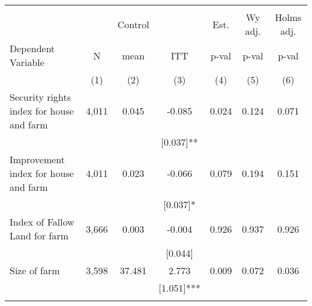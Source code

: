 \begin{tabular}{lcccccc}
\hline \noalign{\smallskip} &  &  &  &  &  & \\
 &  & Control &  & Est. & Wy adj. & Holms adj.\\
Dependent Variable & N & mean & ITT & p-val & p-val & p-val\\
 & (1) & (2) & (3) & (4) & (5) & (6)\\
\noalign{\smallskip}\hline \noalign{\smallskip}Security rights index for house and farm & 4,011 & 0.045 & -0.085 & 0.024 & 0.124 & 0.071\\
 &  &  & [0.037]** &  &  & \\
Improvement index for house and farm & 4,011 & 0.023 & -0.066 & 0.079 & 0.194 & 0.151\\
 &  &  & [0.037]* &  &  & \\
Index of Fallow Land for farm & 3,666 & 0.003 & -0.004 & 0.926 & 0.937 & 0.926\\
 &  &  & [0.044] &  &  & \\
Size of farm & 3,598 & 37.481 & 2.773 & 0.009 & 0.072 & 0.036\\
 &  &  & [1.051]*** &  &  & \\
\noalign{\smallskip}\hline\end{tabular}
